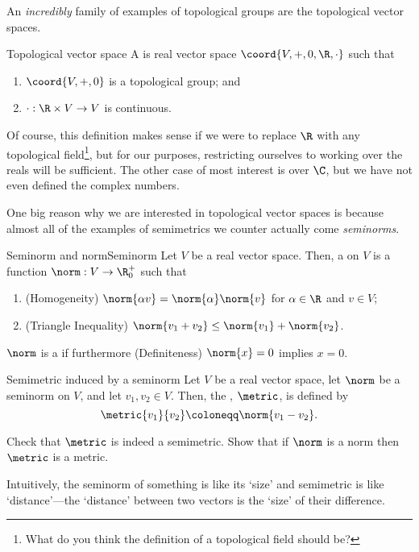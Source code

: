 An \emph{incredibly} family of examples of topological groups are the topological vector spaces.
\begin{dfn}{Topological vector space}{}
A  is real vector space $\coord{V,+,0,\R ,\cdot}$ such that
\begin{enumerate}
\item $\coord{V,+,0}$ is a topological group; and
\item $\cdot :\R \times V\rightarrow V$ is continuous.
\end{enumerate}
\begin{rmk}
Of course, this definition makes sense if we were to replace $\R$ with any topological field\footnote{What do you think the definition of a topological field should be?}, but for our purposes, restricting ourselves to working over the reals will be sufficient.  The other case of most interest is over $\C$, but we have not even defined the complex numbers.
\end{rmk}
\end{dfn}
One big reason why we are interested in topological vector spaces is because almost all of the examples of semimetrics we counter actually come \emph{seminorms}.
\begin{dfn}{Seminorm and norm}{Seminorm}
Let $V$ be a real vector space.  Then, a  on $V$ is a function $\norm :V\rightarrow \R _0^+$ such that
\begin{enumerate}
\item (Homogeneity) $\norm{\alpha v}=\norm{\alpha }\norm{v}$ for $\alpha \in \R$ and $v\in V$;
\item (Triangle Inequality) $\norm{v_1+v_2}\leq \norm{v_1}+\norm{v_2}$.
\end{enumerate}
$\norm$ is a  if furthermore (Definiteness) $\norm{x}=0$ implies $x=0$.
\end{dfn}
\begin{dfn}{Semimetric induced by a seminorm}{}
Let $V$ be a real vector space, let $\norm$ be a seminorm on $V$, and let $v_1,v_2\in V$.  Then, the , $\metric$, is defined by
\begin{equation}
\metric{v_1}{v_2}\coloneqq \norm{v_1-v_2}.
\end{equation}
\begin{exr}[breakable=false]{}{}
Check that $\metric$ is indeed a semimetric.  Show that if $\norm$ is a norm then $\metric$ is a metric.
\end{exr}
\begin{rmk}
Intuitively, the seminorm of something is like its `size' and semimetric is like `distance'---the `distance' between two vectors is the `size' of their difference.
\end{rmk}
\end{dfn}
